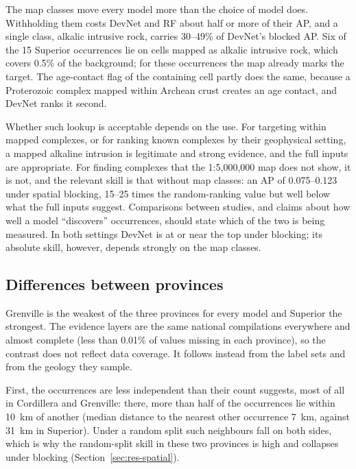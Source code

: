 \documentclass[pdflatex,sn-apa]{sn-jnl}
\begin{document}
The map classes move every model more than the choice of model does. Withholding them costs DevNet and RF about half or more of their AP, and a single class, alkalic intrusive rock, carries 30--49\% of DevNet's blocked AP. Six of the 15 Superior occurrences lie on cells mapped as alkalic intrusive rock, which covers 0.5\% of the background; for these occurrences the map already marks the target. The age-contact flag of the containing cell partly does the same, because a Proterozoic complex mapped within Archean crust creates an age contact, and DevNet ranks it second.

Whether such lookup is acceptable depends on the use. For targeting within mapped complexes, or for ranking known complexes by their geophysical setting, a mapped alkaline intrusion is legitimate and strong evidence, and the full inputs are appropriate. For finding complexes that the 1:5,000,000 map does not show, it is not, and the relevant skill is that without map classes: an AP of 0.075--0.123 under spatial blocking, 15--25 times the random-ranking value but well below what the full inputs suggest. Comparisons between studies, and claims about how well a model ``discovers'' occurrences, should state which of the two is being measured. In both settings DevNet is at or near the top under blocking; its absolute skill, however, depends strongly on the map classes.

\subsection{Differences between provinces}\label{sec:disc-provinces}

Grenville is the weakest of the three provinces for every model and Superior the strongest. The evidence layers are the same national compilations everywhere and almost complete (less than 0.01\% of values missing in each province), so the contrast does not reflect data coverage. It follows instead from the label sets and from the geology they sample.

First, the occurrences are less independent than their count suggests, most of all in Cordillera and Grenville: there, more than half of the occurrences lie within 10~km of another (median distance to the nearest other occurrence 7~km, against 31~km in Superior). Under a random split such neighbours fall on both sides, which is why the random-split skill in these two provinces is high and collapses under blocking (Section~\ref{sec:res-spatial}).
\end{document}
